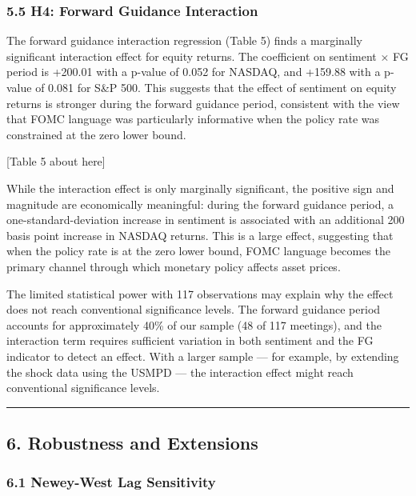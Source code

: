 \documentclass[
]{article}
\begin{document}
\subsubsection{5.5 H4: Forward Guidance
Interaction}\label{h4-forward-guidance-interaction}

The forward guidance interaction regression (Table 5) finds a marginally
significant interaction effect for equity returns. The coefficient on
sentiment × FG period is +200.01 with a p-value of 0.052 for NASDAQ, and
+159.88 with a p-value of 0.081 for S\&P 500. This suggests that the
effect of sentiment on equity returns is stronger during the forward
guidance period, consistent with the view that FOMC language was
particularly informative when the policy rate was constrained at the
zero lower bound.

{[}Table 5 about here{]}

While the interaction effect is only marginally significant, the
positive sign and magnitude are economically meaningful: during the
forward guidance period, a one-standard-deviation increase in sentiment
is associated with an additional 200 basis point increase in NASDAQ
returns. This is a large effect, suggesting that when the policy rate is
at the zero lower bound, FOMC language becomes the primary channel
through which monetary policy affects asset prices.

The limited statistical power with 117 observations may explain why the
effect does not reach conventional significance levels. The forward
guidance period accounts for approximately 40\% of our sample (48 of 117
meetings), and the interaction term requires sufficient variation in
both sentiment and the FG indicator to detect an effect. With a larger
sample --- for example, by extending the shock data using the USMPD ---
the interaction effect might reach conventional significance levels.

\begin{center}\rule{0.5\linewidth}{0.5pt}\end{center}

\subsection{6. Robustness and
Extensions}\label{robustness-and-extensions}

\subsubsection{6.1 Newey-West Lag
Sensitivity}\label{newey-west-lag-sensitivity}
\end{document}
